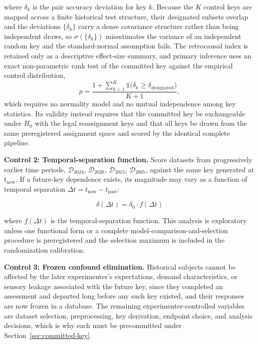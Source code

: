 \documentclass[11pt,letterpaper]{article}
\begin{document}
where $\delta_k$ is the pair accuracy deviation for key $k$. Because the $K$ control keys are mapped across a finite historical test structure, their designated subsets overlap and the deviations $\{\delta_k\}$ carry a dense covariance structure rather than being independent draws, so $\sigma(\{\delta_k\})$ misestimates the variance of an independent random key and the standard-normal assumption fails. The retrocausal index is retained only as a descriptive effect-size summary, and primary inference uses an exact non-parametric rank test of the committed key against the empirical control distribution,
\begin{equation}
p = \frac{1 + \sum_{k=1}^{K} \mathbb{1}\big(\delta_k \geq \delta_{\text{designated}}\big)}{K + 1},
\label{eq:retroperm}
\end{equation}
which requires no normality model and no mutual independence among key statistics. Its validity instead requires that the committed key be exchangeable under $H_0$ with the legal reassignment keys and that all keys be drawn from the same preregistered assignment space and scored by the identical complete pipeline.

\textbf{Control 2: Temporal-separation function.} Score datasets from progressively earlier time periods, $\mathcal{D}_{2024}$, $\mathcal{D}_{2020}$, $\mathcal{D}_{2015}$, $\mathcal{D}_{2005}$, against the same key generated at $t_{\text{now}}$. If a future-key dependence exists, its magnitude may vary as a function of temporal separation $\Delta t = t_{\text{now}} - t_{\text{past}}$:

\begin{equation}
\delta(\Delta t) = \delta_0 \cdot f(\Delta t)
\end{equation}

where $f(\Delta t)$ is the temporal-separation function. This analysis is exploratory unless one functional form or a complete model-comparison-and-selection procedure is preregistered and the selection maximum is included in the randomization calibration.

\textbf{Control 3: Frozen confound elimination.} Historical subjects cannot be affected by the later experimenter's expectations, demand characteristics, or sensory leakage associated with the future key, since they completed an assessment and departed long before any such key existed, and their responses are now frozen in a database. The remaining experimenter-controlled variables are dataset selection, preprocessing, key derivation, endpoint choice, and analysis decisions, which is why each must be precommitted under Section~\ref{sec:committed-key}.
\end{document}
